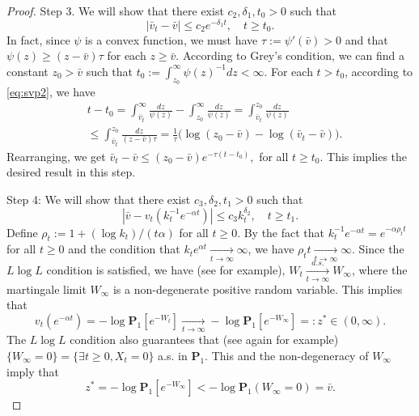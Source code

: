\documentclass[12pt,a4paper]{amsart}
\theoremstyle{plain}
\theoremstyle{definition}
\numberwithin{equation}{section}
\begin{document}
\begin{proof}
  Step 3. We will show that there exist $c_2, \delta_1, t_0 > 0$ such that
  \[
    |\bar v_t-\bar v|
    \leq c_2e^{-\delta_1 t}
    , \quad t\geq t_0.
  \]
  In fact, since $\psi$ is a convex function, we must have $\tau:=\psi'(\bar v)>0$ and that  $\psi(z) \geq (z-\bar v)\tau$ for each $z\geq \bar v$.
  According to Grey's condition, we can find a constant $z_0 >\bar v $ such that
  $t_0 := \int^\infty_{z_0}\psi(z)^{-1}dz<\infty$.
  For each $t > t_0$, according to \eqref{eq:svp2}, we have
  \begin{align}
    & t - t_0 =
      \int^\infty_{\bar v_t} \frac{dz}{\psi(z)} - \int_{z_0}^\infty \frac{dz}{\psi(z)}
      = \int_{\bar v_t}^{z_0} \frac{dz}{\psi(z)} \\ 
    & \leq \int_{\bar v_t}^{z_0} \frac{dz}{(z-\bar v)\tau}
      = \frac{1}{\tau} \big(\log (z_0-\bar v) - \log(\bar v_t-\bar v)\big).
  \end{align}
  Rearranging, we get
  $
  \bar v_t - \bar v \leq (z_0 - \bar v)e^{-\tau(t-t_0)},
  $ for all $t\geq t_0$.
  This implies the desired result in this step.
  
  Step 4: 
  We will show that there exist $c_3, \delta_2, t_1>0$ such that
  \[
    |\bar v - v_t(k_t^{-1} e^{-\alpha t})|\leq
    c_3k_t^{\delta_2}, \quad t\geq t_1.
  \]
  Define
  $\rho_t := 1+(\log k_t)/(t\alpha)$ for all $t\geq 0$.
  By the fact that $k_t^{-1}e^{-\alpha t} = e^{-\alpha \rho_t t}$ for  all $t\geq 0$ and the condition that $k_t e^{\alpha t} \xrightarrow[t\to \infty]{} \infty$, we have $\rho_t t \xrightarrow[t\to \infty]{} \infty $.
  Since the $L\log L$ condition is satisfied, we have (see \cite{LiuRenSong2009Llog} for example), $W_t \xrightarrow[t\to \infty]{a.s.} W_\infty$, where the martingale limit $W_\infty$ is a non-degenerate positive random variable. This implies that
\[
  v_t(e^{-\alpha t}) 
  = -\log \mathbf P_1[e^{-W_t}]\xrightarrow[t\to \infty]{} - \log \mathbf P_{1}[e^{-W_\infty}] 
  =: z^* \in (0,\infty).
\]
The $L \log L$ condition also guarantees that (see again \cite{LiuRenSong2009Llog} for example) $\{W_\infty = 0\} = \{\exists t \geq 0, X_t= 0\}$  a.s. in $\mathbf P_1$. This and the non-degeneracy of $W_\infty$ imply that
\[
  z^*
  = -\log \mathbf P_1[e^{-W_\infty}] 
  < -\log \mathbf P_1(W_\infty = 0) = \bar v.
\]


\end{proof}
\end{document}
